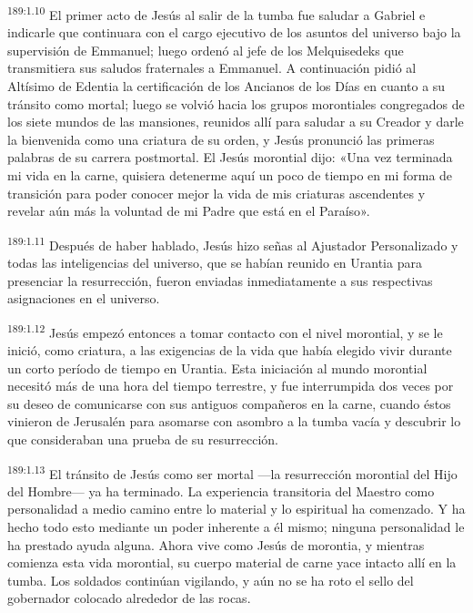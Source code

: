 \par 
\textsuperscript{189:1.10} El primer acto de Jesús al salir de la tumba fue saludar a Gabriel e indicarle que continuara con el cargo ejecutivo de los asuntos del universo bajo la supervisión de Emmanuel; luego ordenó al jefe de los Melquisedeks que transmitiera sus saludos fraternales a Emmanuel. A continuación pidió al Altísimo de Edentia la certificación de los Ancianos de los Días en cuanto a su tránsito como mortal; luego se volvió hacia los grupos morontiales congregados de los siete mundos de las mansiones, reunidos allí para saludar a su Creador y darle la bienvenida como una criatura de su orden, y Jesús pronunció las primeras palabras de su carrera postmortal. El Jesús morontial dijo: «Una vez terminada mi vida en la carne, quisiera detenerme aquí un poco de tiempo en mi forma de transición para poder conocer mejor la vida de mis criaturas ascendentes y revelar aún más la voluntad de mi Padre que está en el Paraíso».

\par 
\textsuperscript{189:1.11} Después de haber hablado, Jesús hizo señas al Ajustador Personalizado y todas las inteligencias del universo, que se habían reunido en Urantia para presenciar la resurrección, fueron enviadas inmediatamente a sus respectivas asignaciones en el universo.

\par 
\textsuperscript{189:1.12} Jesús empezó entonces a tomar contacto con el nivel morontial, y se le inició, como criatura, a las exigencias de la vida que había elegido vivir durante un corto período de tiempo en Urantia. Esta iniciación al mundo morontial necesitó más de una hora del tiempo terrestre, y fue interrumpida dos veces por su deseo de comunicarse con sus antiguos compañeros en la carne, cuando éstos vinieron de Jerusalén para asomarse con asombro a la tumba vacía y descubrir lo que consideraban una prueba de su resurrección.

\par 
\textsuperscript{189:1.13} El tránsito de Jesús como ser mortal ---la resurrección morontial del Hijo del Hombre--- ya ha terminado. La experiencia transitoria del Maestro como personalidad a medio camino entre lo material y lo espiritual ha comenzado. Y ha hecho todo esto mediante un poder inherente a él mismo; ninguna personalidad le ha prestado ayuda alguna. Ahora vive como Jesús de morontia, y mientras comienza esta vida morontial, su cuerpo material de carne yace intacto allí en la tumba. Los soldados continúan vigilando, y aún no se ha roto el sello del gobernador colocado alrededor de las rocas.

